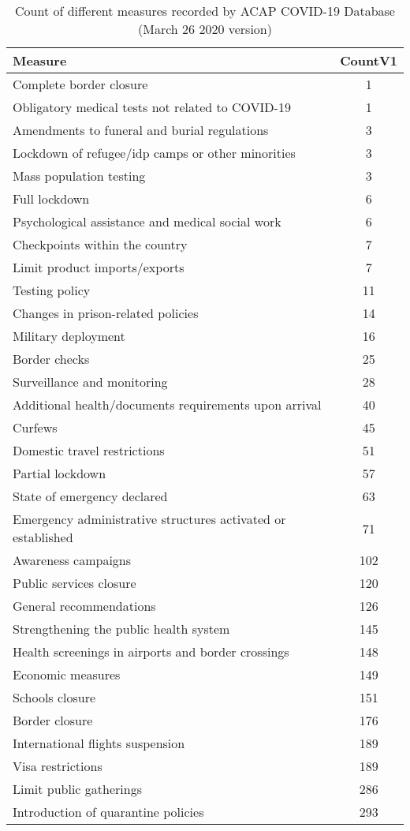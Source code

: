 \documentclass[12pt]{article}
\begin{document}
 \begin{table}[ht]
\centering
\caption{Count of different measures recorded by ACAP COVID-19 Database (March 26 2020 version)}
\begin{tabular}{lc}
  \hline
 Measure & CountV1 \\ 
  \hline
Complete border closure &   1 \\ 
  Obligatory medical tests not related to COVID-19 &   1 \\ 
  Amendments to funeral and burial regulations &   3 \\ 
  Lockdown of refugee/idp camps or other minorities &   3 \\ 
  Mass population testing &   3 \\ 
  Full lockdown &   6 \\ 
  Psychological assistance and medical social work &   6 \\ 
  Checkpoints within the country &   7 \\ 
  Limit product imports/exports &   7 \\ 
  Testing policy &  11 \\ 
  Changes in prison-related policies &  14 \\ 
  Military deployment &  16 \\ 
  Border checks &  25 \\ 
  Surveillance and monitoring &  28 \\ 
  Additional health/documents requirements upon arrival &  40 \\ 
  Curfews &  45 \\ 
  Domestic travel restrictions &  51 \\ 
  Partial lockdown &  57 \\ 
  State of emergency declared &  63 \\ 
  Emergency administrative structures activated or established &  71 \\ 
  Awareness campaigns & 102 \\ 
  Public services closure & 120 \\ 
  General recommendations & 126 \\ 
  Strengthening the public health system & 145 \\ 
  Health screenings in airports and border crossings & 148 \\ 
  Economic measures & 149 \\ 
  Schools closure & 151 \\ 
  Border closure & 176 \\ 
  International flights suspension & 189 \\ 
  Visa restrictions & 189 \\ 
  Limit public gatherings & 286 \\ 
  Introduction of quarantine policies & 293 \\ 

   \hline
\end{tabular}
\end{table}
\end{document}
